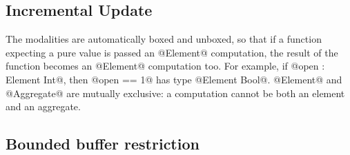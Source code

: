 \subsection{Incremental Update}


The modalities are automatically boxed and unboxed, so that if a function expecting a pure value is passed an @Element@ computation, the result of the function becomes an @Element@ computation too. For example, if @open : Element Int@, then @open == 1@ has type @Element Bool@. @Element@ and @Aggregate@ are mutually exclusive: a computation cannot be both an element and an aggregate.







\subsection{Bounded buffer restriction}
\label{s:IcicleSource:bounded}

